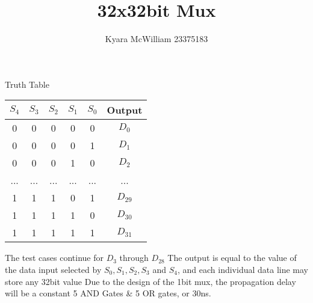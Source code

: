 \documentclass{article}
\title{32x32bit Mux}
\author{Kyara McWilliam 23375183}
\date{}
\begin{document}
\maketitle

Truth Table

\begin{tabular}{ |c|c|c|c|c|c| }
\hline
$S_4$ & $S_3$ & $S_2$ & $S_1$ & $S_0$ & Output \\
\hline
0 & 0 & 0 & 0 & 0 & $D_0$ \\
0 & 0 & 0 & 0 & 1 & $D_1$ \\
0 & 0 & 0 & 1 & 0 & $D_2$ \\
... & ... & ... & ... & ... & ... \\
1 & 1 & 1 & 0 & 1 & $D_{29}$ \\
1 & 1 & 1 & 1 & 0 & $D_{30}$ \\
1 & 1 & 1 & 1 & 1 & $D_{31}$ \\
\hline
\end{tabular}
\hfill \break

The test cases continue for $D_3$ through $D_{28}$ \newline
The output is equal to the value of the data input selected by $S_0, S_1, S_2, S_3$ and $S_4$, and each individual data  line may store any 32bit value \newline
Due to the design of the 1bit mux, the propagation delay will be a constant 5 AND Gates \& 5 OR gates, or 30ns.
\end{document}
